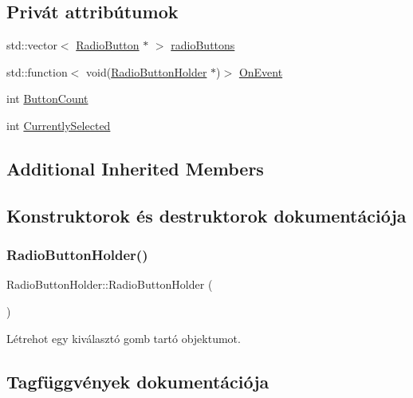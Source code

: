 \subsection*{Privát attribútumok}
\begin{DoxyCompactItemize}
\item 
std\+::vector$<$ \hyperlink{class_radio_button}{Radio\+Button} $\ast$ $>$ \hyperlink{class_radio_button_holder_aaed6e22df55ff0174b150c675caff07a}{radio\+Buttons}
\item 
std\+::function$<$ void(\hyperlink{class_radio_button_holder}{Radio\+Button\+Holder} $\ast$)$>$ \hyperlink{class_radio_button_holder_ac2ecfd4a57032afaa6455f9b559a00b3}{On\+Event}
\item 
int \hyperlink{class_radio_button_holder_a115a7d96d3c3a7a97d3e9bc4d04b50e0}{Button\+Count}
\item 
int \hyperlink{class_radio_button_holder_a72c73d2f99d20384f334903cec24040e}{Currently\+Selected}
\end{DoxyCompactItemize}
\subsection*{Additional Inherited Members}


\subsection{Konstruktorok és destruktorok dokumentációja}
\mbox{\label{class_radio_button_holder_ab100a3d26a036b76ead2bcd4331e8552}} 
\subsubsection{\texorpdfstring{Radio\+Button\+Holder()}{RadioButtonHolder()}}
{\footnotesize\ttfamily Radio\+Button\+Holder\+::\+Radio\+Button\+Holder (\begin{DoxyParamCaption}{ }\end{DoxyParamCaption})}



Létrehot egy kiválasztó gomb tartó objektumot. 



\subsection{Tagfüggvények dokumentációja}
\mbox{\label{class_radio_button_holder_ab9ac730a7440439eb73b892f193741ae}} 
